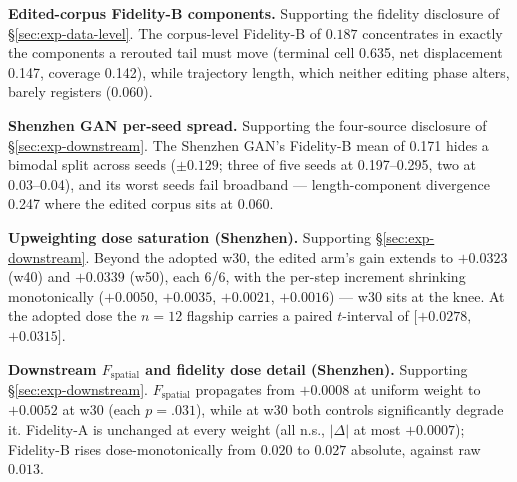 \textbf{Edited-corpus Fidelity-B components.} Supporting the fidelity
disclosure of \S\ref{sec:exp-data-level}. The corpus-level Fidelity-B of
$0.187$ concentrates in exactly the components a rerouted tail must move
(terminal cell 0.635, net displacement 0.147, coverage 0.142), while
trajectory length, which neither editing phase alters, barely registers
(0.060).


\textbf{Shenzhen GAN per-seed spread.} Supporting the four-source
disclosure of \S\ref{sec:exp-downstream}. The Shenzhen GAN's Fidelity-B mean
of 0.171 hides a bimodal split across seeds ($\pm 0.129$; three of five
seeds at 0.197--0.295, two at 0.03--0.04), and its worst seeds fail
broadband --- length-component divergence 0.247 where the edited corpus sits
at 0.060.

\textbf{Upweighting dose saturation (Shenzhen).} Supporting
\S\ref{sec:exp-downstream}. Beyond the adopted w30, the edited arm's gain
extends to $+0.0323$ (w40) and $+0.0339$ (w50), each 6/6, with the per-step
increment shrinking monotonically ($+0.0050$, $+0.0035$, $+0.0021$,
$+0.0016$) --- w30 sits at the knee. At the adopted dose the $n = 12$ flagship
carries a paired $t$-interval of $[+0.0278,$ $+0.0315]$. %

\textbf{Downstream $F_{\mathrm{spatial}}$ and fidelity dose detail (Shenzhen).}
Supporting \S\ref{sec:exp-downstream}. $F_{\mathrm{spatial}}$ propagates from
$+0.0008$ at uniform weight to $+0.0052$ at w30 (each $p = .031$), while at w30
both controls significantly degrade it. Fidelity-A is unchanged at every weight
(all n.s., $|\Delta|$ at most $+0.0007$); Fidelity-B rises dose-monotonically
from $0.020$ to $0.027$ absolute, against raw $0.013$.


